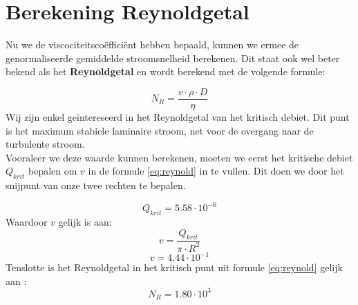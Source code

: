 \section{Berekening Reynoldgetal}

Nu we de viscociteitsco\"effici\"ent hebben bepaald, kunnen we ermee de genormaliseerde
gemiddelde stroomsnelheid berekenen. Dit staat ook wel beter bekend als het 
\textbf{Reynoldgetal} en wordt berekend met de volgende formule:

\begin{equation}
    \label{eq:reynold}
    N_R = \frac{v\cdot \rho \cdot D}{\eta}
\end{equation}
Wij zijn enkel geïntereseerd in het Reynoldgetal van het kritisch debiet. Dit punt is  
het maximum stabiele laminaire stroom, net voor de overgang naar de turbulente stroom.\\

Vooraleer we deze waarde kunnen berekenen, moeten we eerst het kritische debiet $Q_{krit}$ bepalen
om $v$ in de formule \eqref{eq:reynold} in te vullen. Dit doen we door het snijpunt van 
onze twee rechten te bepalen.

\begin{equation*}
    Q_{krit} = 5.58 \cdot 10^{-6}
\end{equation*}
Waardoor $v$ gelijk is aan:
\begin{equation}
    v = \frac{Q_{krit}}{\pi \cdot R^2}
\end{equation}
\begin{equation*}
    v = 4.44 \cdot 10^{-1}
\end{equation*}
Tenslotte is het Reynoldgetal in het kritisch punt uit formule \eqref{eq:reynold} gelijk aan :
\begin{equation*}
    N_R = 1.80 \cdot 10^{3}
\end{equation*}
